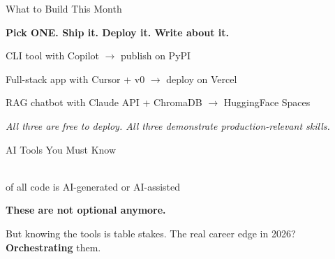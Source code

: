 \begin{frame}{What to Build This Month}
\begin{center}
  {\normalsize\bfseries Pick ONE. Ship it. Deploy it. Write about it.}
\end{center}
\vspace{0.6em}
\begin{keybox}[]
  \begin{description}[labelwidth=2.8cm, leftmargin=3.1cm]
    \item[\positive{Beginner}\ (4--8h)] CLI tool with Copilot $\rightarrow$ publish on PyPI
    \item[\higold{Intermediate}\ (6--10h)] Full-stack app with Cursor + v0 $\rightarrow$ deploy on Vercel
    \item[\hi{Advanced}\ (4--6h)] RAG chatbot with Claude API + ChromaDB $\rightarrow$ HuggingFace Spaces
  \end{description}
\end{keybox}
\vspace{0.8em}
\begin{center}
  {\small\itshape All three are free to deploy.
  All three demonstrate production-relevant skills.}
\end{center}
\end{frame}


\begin{frame}{AI Tools You Must Know}
\begin{center}
  {\fontsize{64}{72}\selectfont{}}\\[0.3em]
  {\normalsize of all code is AI-generated or AI-assisted}\\[0.2em]
  {\footnotesize{}}
\end{center}
\vspace{0.8em}
\begin{center}
   \quad\textperiodcentered\quad
   \quad\textperiodcentered\quad
   \quad\textperiodcentered\quad
   \quad\textperiodcentered\quad
\end{center}
\vspace{0.8em}
\begin{highlightbox}[]
  \centering
  {\normalsize\bfseries These are not optional anymore.}
\end{highlightbox}
\vspace{0.4em}
\begin{keybox}[]
  \centering
  \small But knowing the tools is table stakes. The real career edge in 2026? \textbf{Orchestrating} them.
\end{keybox}
\end{frame}

